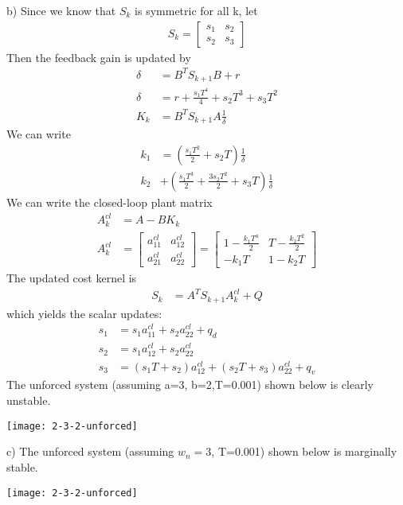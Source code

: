 \documentclass{article}
\begin{document}
  b) Since we know that $S_k$ is symmetric for all k, let 
  \begin{align*}
	  S_k=\begin{bmatrix}
		  s_1 & s_2 \\
		  s_2 & s_3
	  \end{bmatrix}
  \end{align*}
  Then the feedback gain is updated by
  \begin{align*}
	  \delta&=B^TS_{k+1}B+r \\
	  \delta&=r+\frac{s_1T^4}{4}+s_2T^3+s_3T^2 \\
	  K_k&=B^TS_{k+1}A\frac{1}{\delta}
  \end{align*}
  We can write
  \begin{align*}
	  k_1&=(\frac{s_1T^2}{2}+s_2T)\frac{1}{\delta} \\
	  k_2&+(\frac{s_1T^3}{2}+\frac{3s_2T^2}{2}+s_3T)\frac{1}{\delta}
  \end{align*}
   We can write the closed-loop plant matrix
   \begin{align*}
	   A_k^{cl}&=A-BK_k \\
	   A_k^{cl}&=
	   \begin{bmatrix}
		   a_{11}^{cl} & a_{12}^{cl} \\
		   a_{21}^{cl} & a_{22}^{cl}
	   \end{bmatrix}=
	   \begin{bmatrix}
		   1-\frac{k_1T^a}{2} & T-\frac{k_2T^2}{2} \\
		   -k_1T & 1-k_2T
	   \end{bmatrix}
   \end{align*}
   The updated cost kernel is 
   \begin{align*}
	   S_k&=A^TS_{k+1}A_k^{cl}+Q
   \end{align*}
   which yields the scalar updates:
   \begin{align*}
	   s_1&=s_1a_{11}^{cl}+s_2a_{22}^{cl}+q_d \\
	   s_2&=s_1a_{12}^{cl}+s_2a_{22}^{cl} \\
	   s_3&=(s_1T+s_2)a_{12}^{cl}+(s_2T+s_3)a_{22}^{cl}+q_v
   \end{align*}
  The unforced system (assuming a=3, b=2,T=0.001) shown below is clearly unstable. \newline
  \begin{center}
  \texttt{[image: 2-3-2-unforced]}
  \end{center}

  c) The unforced system (assuming $w_n=3$, T=0.001) shown below is marginally stable. \newline
  \begin{center}
  \texttt{[image: 2-3-2-unforced]}
  \end{center}
\end{document}
